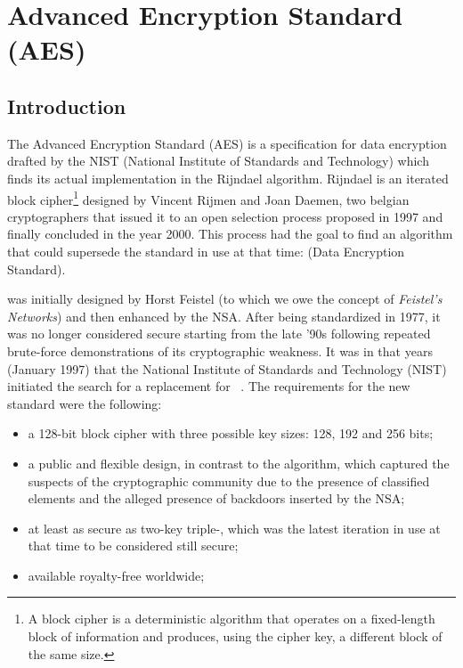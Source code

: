 \chapter{Advanced Encryption Standard (AES)}\label{chap:aes}

\section{Introduction}\label{sec:aes_intro}
    The Advanced Encryption Standard (AES) is a specification for data encryption drafted by the NIST (National Institute of Standards and Technology) which finds its actual implementation in the Rijndael algorithm. Rijndael is an iterated block cipher\footnote{A block cipher is a deterministic algorithm that operates on a fixed-length block of information and produces, using the cipher key, a different block of the same size.} designed by Vincent Rijmen and Joan Daemen, two belgian cryptographers that issued it to an open selection process proposed in 1997 and finally concluded in the year 2000. This process had the goal to find an algorithm that could supersede the standard in use at that time: \des{} (Data Encryption Standard).

    \des{} was initially designed by Horst Feistel (to which we owe the concept of \textit{Feistel's Networks}) and then enhanced by the NSA. After being standardized in 1977, it was no longer considered secure starting from the late '90s following repeated brute-force demonstrations of its cryptographic weakness. It was in that years (January 1997) that the National Institute of Standards and Technology (NIST) initiated the search for a replacement for \des{}~\cite{dobbertin2004cryptanalysis}. The requirements for the new standard were the following:

    \begin{itemize}
        \item a 128-bit block cipher with three possible key sizes: 128, 192 and 256 bits;
        \item a public and flexible design, in contrast to the \des{} algorithm, which captured the suspects of the cryptographic community due to the presence of classified elements and the alleged presence of backdoors inserted by the NSA;
        \item  at least as secure as two-key triple-\des{}, which was the latest \des{} iteration in use at that time to be considered still secure;
        \item available royalty-free worldwide;
    \end{itemize}


